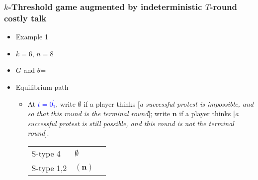 \documentclass[9pt,handout]{beamer}
\begin{document}
\begin{frame}
  \frametitle{$k$-Threshold game augmented by indeterministic $T$-round costly talk}

\begin{itemize}
\item Example 1
\item $k=6$, $n=8$
\item $G$ and $\theta$=
\begin{center}
\end{center}
\end{itemize}

\begin{itemize}
\item Equilibrium path
\begin{itemize}
\item 

At \textcolor{blue}{$t=0^{'}_1$}, write $\emptyset$ if a player thinks \alert{[}\textit{a successful protest is impossible, and so that this round is the terminal round}\alert{]}; write ${\textbf{n}}$ if a player thinks \alert{[}\textit{a successful protest is still possible, and this round is not the terminal round}\alert{]}. 
\begin{table}[h]
\begin{tabular}{ll l}
S-type 4 & $\emptyset$\\
S-type 1,2 & $({\textbf{n}})$
\end{tabular}
\end{table}


\end{itemize}
\end{itemize}

\end{frame}
\end{document}
